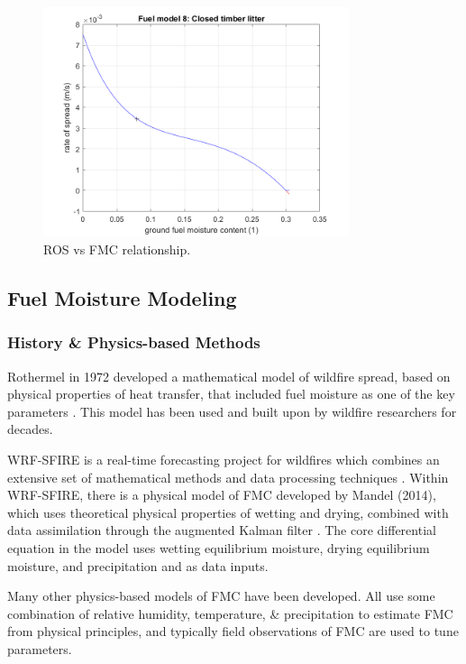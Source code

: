 \documentclass[11pt]{article}%
\begin{document}
\begin{figure}[ht]
    \centering
    \includegraphics[width=0.8\textwidth]{images/fuel8_ros_fm.png}
    \caption{ROS vs FMC relationship.}
    \label{fig:fmc_ros_fmc}
\end{figure}

\subsection{Fuel Moisture Modeling}
\subsubsection{History \& Physics-based Methods}

Rothermel in 1972 developed a mathematical model of wildfire spread, based on physical properties of heat transfer, that included fuel moisture as one of the key parameters \cite{Rothermel-1972-MMP}. This model has been used and built upon by wildfire researchers for decades. 

WRF-SFIRE is a real-time forecasting project for wildfires which combines an extensive set of mathematical methods and data processing techniques \cite{openwfm}. Within WRF-SFIRE, there is a physical model of FMC developed by Mandel (2014), which uses theoretical physical properties of wetting and drying, combined with data assimilation through the augmented Kalman filter \cite{Mandel-2014-RAA}. The core differential equation in the model uses wetting equilibrium moisture, drying equilibrium moisture, and precipitation and as data inputs.

Many other physics-based models of FMC have been developed. All use some combination of relative humidity, temperature, \& precipitation to estimate FMC from physical principles, and typically field observations of FMC are used to tune parameters. \cite{Catchpole-1999-EFR}\cite{Nelson-2000-PDC}\cite{vanderKamp-2017-MFS}
\end{document}
